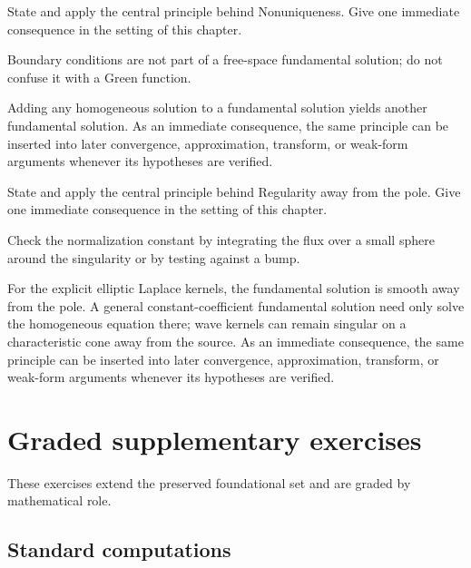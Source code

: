\begin{exercise}\label{exr:iii24-07}
State and apply the central principle behind Nonuniqueness. Give one immediate consequence in the setting of this chapter.
\end{exercise}
\begin{hint}
Boundary conditions are not part of a free-space fundamental solution; do not confuse it with a Green function.
\end{hint}
\begin{solution}
Adding any homogeneous solution to a fundamental solution yields another fundamental solution. As an immediate consequence, the same principle can be inserted into later convergence, approximation, transform, or weak-form arguments whenever its hypotheses are verified.
\end{solution}

\begin{exercise}\label{exr:iii24-08}
State and apply the central principle behind Regularity away from the pole. Give one immediate consequence in the setting of this chapter.
\end{exercise}
\begin{hint}
Check the normalization constant by integrating the flux over a small sphere around the singularity or by testing against a bump.
\end{hint}
\begin{solution}
For the explicit elliptic Laplace kernels, the fundamental solution is smooth away from the pole. A general constant-coefficient fundamental solution need only solve the homogeneous equation there; wave kernels can remain singular on a characteristic cone away from the source. As an immediate consequence, the same principle can be inserted into later convergence, approximation, transform, or weak-form arguments whenever its hypotheses are verified.
\end{solution}


\section{Graded supplementary exercises}
These exercises extend the preserved foundational set and are graded by mathematical role.

\subsection*{Standard computations}


